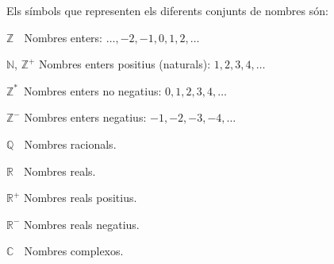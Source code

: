 \pagebreak

Els símbols que representen els diferents conjunts de nombres són:

\begin{list}{}
{\setlength{\labelwidth}{15mm} \setlength{\leftmargin}{20mm}
\setlength{\labelsep}{5mm}}
    \item[$\mathbb{Z\phantom{{}^+}}$] Nombres enters: $\ldots,-2,-1,0,1,2,\ldots$
    \item[$\mathbb{N}$, $\mathbb{Z}^+$] Nombres enters positius
    (naturals): $1,2,3,4,\ldots$
    \item[$\mathbb{Z}^*\,$] Nombres enters no negatius: $0,1,2,3,4,\ldots$
    \item[$\mathbb{Z}^-$] Nombres enters negatius: $-1,-2,-3,-4,\ldots$
    \item[$\mathbb{Q\phantom{{}^+}}$] Nombres racionals.
    \item[$\mathbb{R\phantom{{}^+}}$] Nombres reals.
    \item[$\mathbb{R}^+$] Nombres reals positius.
    \item[$\mathbb{R}^-$] Nombres reals negatius.
    \item[$\mathbb{C\phantom{{}^+}}$] Nombres complexos.
\end{list}
 
 
 
 
 
